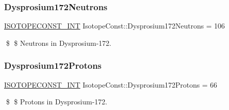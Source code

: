 \subsubsection{\texorpdfstring{Dysprosium172\+Neutrons}{Dysprosium172Neutrons}}
{\footnotesize\ttfamily \mbox{\hyperlink{group___isotope_const-_macros_ga5f18360b3e99483a35c32d789e62621c}{I\+S\+O\+T\+O\+P\+E\+C\+O\+N\+S\+T\+\_\+\+I\+NT}} Isotope\+Const\+::\+Dysprosium172\+Neutrons = 106}

\$ \$ Neutrons in Dysprosium-\/172. \mbox{\label{group___isotope_const-_dysprosium-_dy172_ga97973227a9774330ea9c0b4691684ef0}} 
\subsubsection{\texorpdfstring{Dysprosium172\+Protons}{Dysprosium172Protons}}
{\footnotesize\ttfamily \mbox{\hyperlink{group___isotope_const-_macros_ga5f18360b3e99483a35c32d789e62621c}{I\+S\+O\+T\+O\+P\+E\+C\+O\+N\+S\+T\+\_\+\+I\+NT}} Isotope\+Const\+::\+Dysprosium172\+Protons = 66}

\$ \$ Protons in Dysprosium-\/172. 